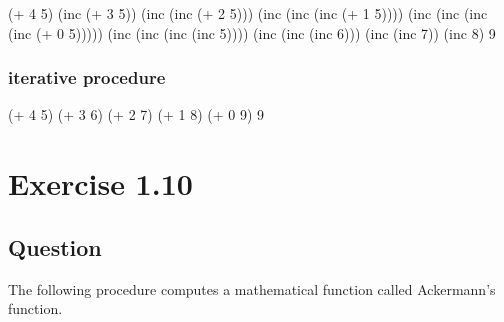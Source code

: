 \documentclass[
]{article}
\newenvironment{Shaded}{}{}
\newcommand{\DecValTok}[1]{\textcolor[rgb]{0.25,0.63,0.44}{#1}}
\newcommand{\NormalTok}[1]{#1}
\newcommand{\OperatorTok}[1]{\textcolor[rgb]{0.40,0.40,0.40}{#1}}
\begin{document}
\begin{Shaded}
\begin{Highlighting}[numbers=left,,]
\NormalTok{(}\OperatorTok{+} \DecValTok{4} \DecValTok{5}\NormalTok{)}
\NormalTok{(inc (}\OperatorTok{+} \DecValTok{3} \DecValTok{5}\NormalTok{))}
\NormalTok{(inc (inc (}\OperatorTok{+} \DecValTok{2} \DecValTok{5}\NormalTok{)))}
\NormalTok{(inc (inc (inc (}\OperatorTok{+} \DecValTok{1} \DecValTok{5}\NormalTok{))))}
\NormalTok{(inc (inc (inc (inc (}\OperatorTok{+} \DecValTok{0} \DecValTok{5}\NormalTok{)))))}
\NormalTok{(inc (inc (inc (inc }\DecValTok{5}\NormalTok{))))}
\NormalTok{(inc (inc (inc }\DecValTok{6}\NormalTok{)))}
\NormalTok{(inc (inc }\DecValTok{7}\NormalTok{))}
\NormalTok{(inc }\DecValTok{8}\NormalTok{)}
\DecValTok{9}
\end{Highlighting}
\end{Shaded}

\hypertarget{iterative-procedure}{%
\subsubsection{iterative procedure}\label{iterative-procedure}}

\begin{Shaded}
\begin{Highlighting}[numbers=left,,]
\NormalTok{(}\OperatorTok{+} \DecValTok{4} \DecValTok{5}\NormalTok{)}
\NormalTok{(}\OperatorTok{+} \DecValTok{3} \DecValTok{6}\NormalTok{)}
\NormalTok{(}\OperatorTok{+} \DecValTok{2} \DecValTok{7}\NormalTok{)}
\NormalTok{(}\OperatorTok{+} \DecValTok{1} \DecValTok{8}\NormalTok{)}
\NormalTok{(}\OperatorTok{+} \DecValTok{0} \DecValTok{9}\NormalTok{)}
\DecValTok{9}
\end{Highlighting}
\end{Shaded}

\hypertarget{exercise-1.10}{%
\section{Exercise 1.10}\label{exercise-1.10}}

\hypertarget{question-9}{%
\subsection{Question}\label{question-9}}

The following procedure computes a mathematical function called
Ackermann's function.
\end{document}
